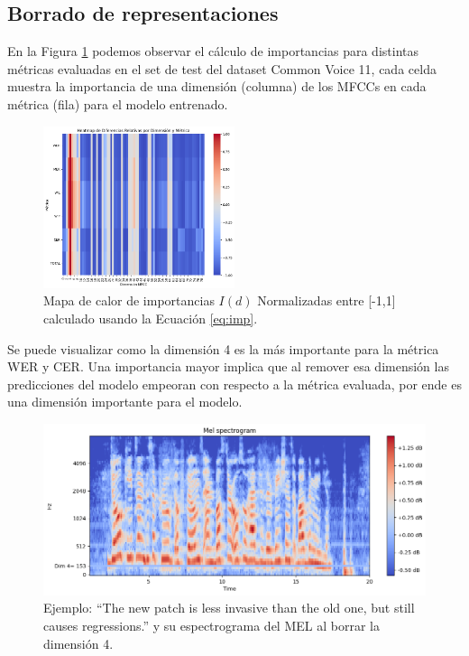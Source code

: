 \documentclass[conference]{IEEEtran}
\begin{document}
\subsection{Borrado de representaciones}

En la Figura \ref{fig:cv_imp} podemos observar el cálculo de importancias para distintas métricas evaluadas en el set de test del dataset Common Voice 11, cada celda muestra la importancia de una dimensión (columna) de los MFCCs en cada métrica (fila) para el modelo entrenado.

\begin{figure}[ht]
\centering
\includegraphics[width=0.5\textwidth]{images/importance_plot_all_dims.png}
\caption{Mapa de calor de importancias $I(d)$ Normalizadas entre [-1,1] calculado usando la Ecuación \ref{eq:imp}.}
\label{fig:cv_imp}
\end{figure}

Se puede visualizar como la dimensión 4 es la más importante para la métrica WER y CER.
Una importancia mayor implica que al remover esa dimensión las predicciones del modelo empeoran con respecto a la métrica evaluada, por ende es una dimensión importante para el modelo.

\begin{figure}[ht]
\centering
\includegraphics[width=\textwidth]{images/dim_4_erasured.png}
\caption{Ejemplo: “The new patch is less invasive than the old one, but still causes regressions.” y su espectrograma del MEL al borrar la dimensión 4.}
\label{fig:mel_erasure_dim_4}
\end{figure}
\end{document}

